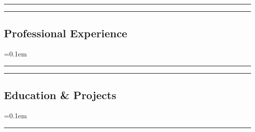 






\hrule
\begin{indentsection}{\parindent}
\begin{description*}
  
  
\end{description*}
\end{indentsection}


\hrule
\vspace{-0.4em}
\subsection*{Professional Experience}
\begin{itemize}
  \parskip=0.1em

  
  
  
  
  
  
\end{itemize}


\vspace*{\fill}


\hrule
\begin{indentsection}{\parindent}
\begin{description*}
  
\end{description*}
\end{indentsection}


\clearpage


\hrule
\vspace{-0.4em}
\subsection*{Education \& Projects}
\begin{itemize}
  \parskip=0.1em

  
  
  
\end{itemize}
\hrule


\vspace*{\fill}


